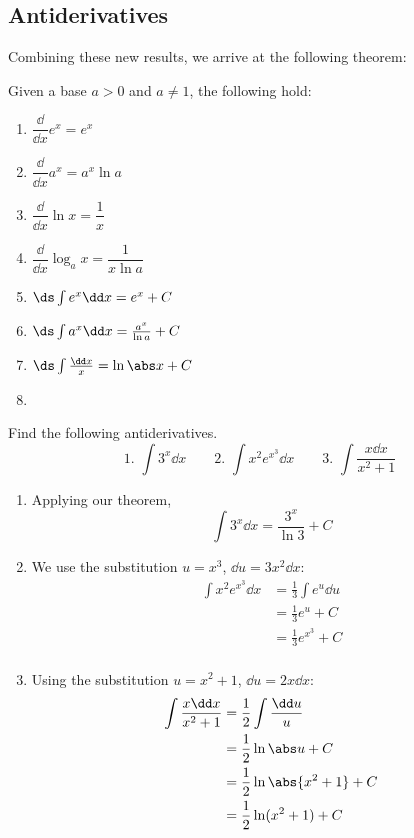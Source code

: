 \subsection{Antiderivatives}

Combining these new results, we arrive at the following theorem:

\begin{theorem}\label{thm_int_exp_log}%
Given a base $a>0$ and $a\neq 1$, the following hold:\\[-1.5\baselineskip]
\begin{multicols}{2}
\begin{enumerate}
\item $\dfrac\dd{\dd x}e^x=e^x$
\item $\dfrac\dd{\dd x}a^x=a^x\ln a$
\item $\dfrac\dd{\dd x}\ln x=\dfrac1x$
\item $\dfrac\dd{\dd x}\log_a x=\dfrac1{x\ln a}$
\item $\ds\int e^x\dd x=e^x+C$
\item $\ds\int a^x\dd x=\frac{a^x}{\ln a}+C$
\item $\ds\int \frac{\dd x}{x}=\ln\abs x+C$
\item[]
\end{enumerate}
\end{multicols}
\end{theorem}

\begin{example}\label{ex_exp_log_anti}%
Find the following antiderivatives.
\[
 \text{1. }\int 3^x\dd x\qquad
 \text{2. }\int x^2 e^{x^3}\dd x\qquad
 \text{3. }\int \frac{x\dd x}{x^2+1}
\]
\solution
\begin{enumerate}
\item Applying our theorem,
\[\int 3^x\dd x=\frac{3^x}{\ln 3}+C\]
\item We use the substitution $u=x^3$, $\dd u=3x^2\dd x$:
\begin{align*}
\int x^2e^{x^3}\dd x &=\frac13 \int e^u\dd u\\
&=\frac 13 e^u+C\\
&=\frac 13 e^{x^3}+C\\
\end{align*}
\item Using the substitution $u=x^2+1$, $\dd u=2x\dd x$:
\begin{align*}
\int \frac{x\dd x}{x^2+1}&=\frac 12 \int \frac{\dd u}{u}\\
&=\frac 12 \ln\abs u+C\\
&=\frac 12 \ln\abs{x^2+1}+C\\
&=\frac 12 \ln(x^2+1)+C
\end{align*}
\end{enumerate}
\end{example}

